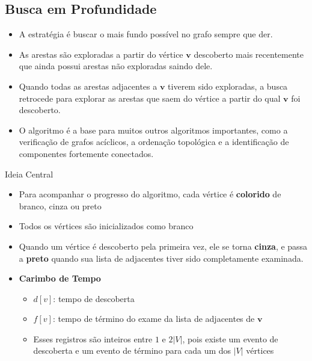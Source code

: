 \documentclass[xcolor=table]{beamer}
\begin{document}
\subsection{Busca em Profundidade}
\begin{frame}
  \begin{itemize}
    \item A estratégia é buscar o mais fundo possível no grafo sempre que der.
    \item As arestas são exploradas a partir do vértice $\mathbf{v}$ descoberto mais recentemente que ainda possui arestas não exploradas saindo dele.
    \item Quando todas as arestas adjacentes a $\mathbf{v}$ tiverem sido exploradas, a busca retrocede para explorar as arestas que saem do vértice a partir do qual $\mathbf{v}$ foi descoberto.
    \item O algoritmo é a base para muitos outros algoritmos importantes, como a verificação de grafos acíclicos, a ordenação topológica e a identificação de componentes fortemente conectados.
  \end{itemize}
\end{frame}

\begin{frame}{Ideia Central}
  \begin{itemize}
    \item Para acompanhar o progresso do algoritmo, cada vértice é \textbf{colorido} de branco, cinza ou preto
    \item Todos os vértices são inicializados como branco
    \item Quando um vértice é descoberto pela primeira vez, ele se torna \textbf{cinza}, e passa a \textbf{preto} quando sua lista de adjacentes tiver sido completamente examinada.
    \item \textbf{Carimbo de Tempo}
    \begin{itemize}
      \item $d[v]$: tempo de descoberta
      \item $f[v]$: tempo de término do exame da lista de adjacentes de $\mathbf{v}$
      \item Esses registros são inteiros entre $1$ e $2|V|$, pois existe um evento de descoberta e um evento de término para cada um dos $|V|$ vértices
    \end{itemize}
  \end{itemize}
\end{frame}
\end{document}
